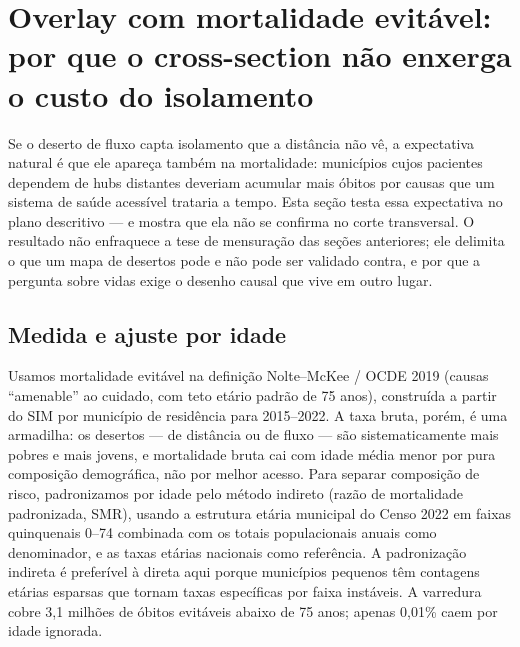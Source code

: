 
\section{Overlay com mortalidade evitável: por que o cross-section não enxerga o
custo do isolamento}
\label{sec:mortalidade}

Se o deserto de fluxo capta isolamento que a distância não vê, a expectativa
natural é que ele apareça também na mortalidade: municípios cujos pacientes
dependem de hubs distantes deveriam acumular mais óbitos por causas que um
sistema de saúde acessível trataria a tempo. Esta seção testa essa expectativa
no plano descritivo --- e mostra que ela não se confirma no corte transversal.
O resultado não enfraquece a tese de mensuração das seções anteriores; ele
delimita o que um mapa de desertos pode e não pode ser validado contra, e por
que a pergunta sobre vidas exige o desenho causal que vive em outro lugar.

\subsection{Medida e ajuste por idade}

Usamos mortalidade evitável na definição Nolte--McKee / OCDE 2019 (causas
``amenable'' ao cuidado, com teto etário padrão de 75 anos), construída a partir
do SIM por município de residência para 2015--2022.%
A taxa bruta, porém, é uma armadilha: os desertos --- de distância ou de fluxo
--- são sistematicamente mais pobres e mais jovens, e mortalidade bruta cai com
idade média menor por pura composição demográfica, não por melhor acesso. Para
separar composição de risco, padronizamos por idade pelo método indireto (razão
de mortalidade padronizada, SMR), usando a estrutura etária municipal do Censo
2022 em faixas quinquenais 0--74 combinada com os totais populacionais anuais
como denominador, e as taxas etárias nacionais como referência.%
A padronização indireta é preferível à direta aqui porque municípios pequenos
têm contagens etárias esparsas que tornam taxas específicas por faixa instáveis.
A varredura cobre 3,1 milhões de óbitos evitáveis abaixo de 75 anos; apenas
0,01\% caem por idade ignorada.%

